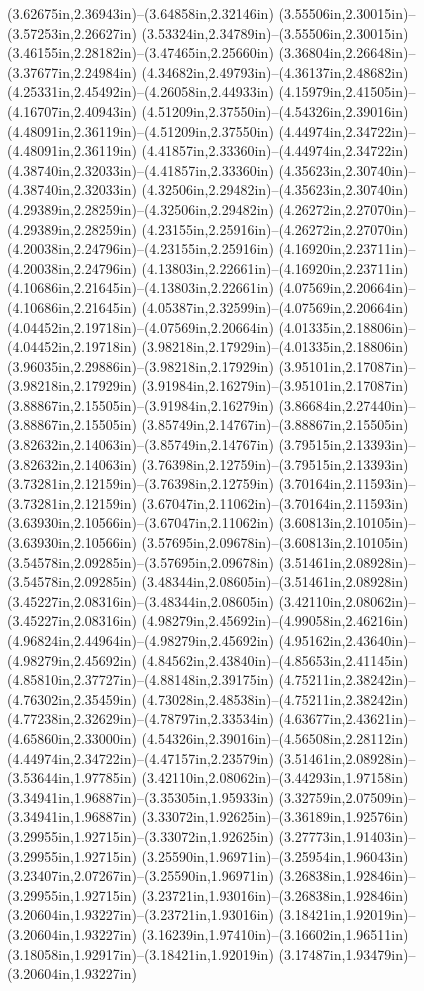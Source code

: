 (3.62675in,2.36943in)--(3.64858in,2.32146in) (3.55506in,2.30015in)--(3.57253in,2.26627in) (3.53324in,2.34789in)--(3.55506in,2.30015in) (3.46155in,2.28182in)--(3.47465in,2.25660in) (3.36804in,2.26648in)--(3.37677in,2.24984in) (4.34682in,2.49793in)--(4.36137in,2.48682in) (4.25331in,2.45492in)--(4.26058in,2.44933in) (4.15979in,2.41505in)--(4.16707in,2.40943in) (4.51209in,2.37550in)--(4.54326in,2.39016in) (4.48091in,2.36119in)--(4.51209in,2.37550in) (4.44974in,2.34722in)--(4.48091in,2.36119in) (4.41857in,2.33360in)--(4.44974in,2.34722in) (4.38740in,2.32033in)--(4.41857in,2.33360in) (4.35623in,2.30740in)--(4.38740in,2.32033in) (4.32506in,2.29482in)--(4.35623in,2.30740in) (4.29389in,2.28259in)--(4.32506in,2.29482in) (4.26272in,2.27070in)--(4.29389in,2.28259in) (4.23155in,2.25916in)--(4.26272in,2.27070in) (4.20038in,2.24796in)--(4.23155in,2.25916in) (4.16920in,2.23711in)--(4.20038in,2.24796in) (4.13803in,2.22661in)--(4.16920in,2.23711in) (4.10686in,2.21645in)--(4.13803in,2.22661in) (4.07569in,2.20664in)--(4.10686in,2.21645in) (4.05387in,2.32599in)--(4.07569in,2.20664in) (4.04452in,2.19718in)--(4.07569in,2.20664in) (4.01335in,2.18806in)--(4.04452in,2.19718in) (3.98218in,2.17929in)--(4.01335in,2.18806in) (3.96035in,2.29886in)--(3.98218in,2.17929in) (3.95101in,2.17087in)--(3.98218in,2.17929in) (3.91984in,2.16279in)--(3.95101in,2.17087in) (3.88867in,2.15505in)--(3.91984in,2.16279in) (3.86684in,2.27440in)--(3.88867in,2.15505in) (3.85749in,2.14767in)--(3.88867in,2.15505in) (3.82632in,2.14063in)--(3.85749in,2.14767in) (3.79515in,2.13393in)--(3.82632in,2.14063in) (3.76398in,2.12759in)--(3.79515in,2.13393in) (3.73281in,2.12159in)--(3.76398in,2.12759in) (3.70164in,2.11593in)--(3.73281in,2.12159in) (3.67047in,2.11062in)--(3.70164in,2.11593in) (3.63930in,2.10566in)--(3.67047in,2.11062in) (3.60813in,2.10105in)--(3.63930in,2.10566in) (3.57695in,2.09678in)--(3.60813in,2.10105in) (3.54578in,2.09285in)--(3.57695in,2.09678in) (3.51461in,2.08928in)--(3.54578in,2.09285in) (3.48344in,2.08605in)--(3.51461in,2.08928in) (3.45227in,2.08316in)--(3.48344in,2.08605in) (3.42110in,2.08062in)--(3.45227in,2.08316in) (4.98279in,2.45692in)--(4.99058in,2.46216in) (4.96824in,2.44964in)--(4.98279in,2.45692in) (4.95162in,2.43640in)--(4.98279in,2.45692in) (4.84562in,2.43840in)--(4.85653in,2.41145in) (4.85810in,2.37727in)--(4.88148in,2.39175in) (4.75211in,2.38242in)--(4.76302in,2.35459in) (4.73028in,2.48538in)--(4.75211in,2.38242in) (4.77238in,2.32629in)--(4.78797in,2.33534in) (4.63677in,2.43621in)--(4.65860in,2.33000in) (4.54326in,2.39016in)--(4.56508in,2.28112in) (4.44974in,2.34722in)--(4.47157in,2.23579in) (3.51461in,2.08928in)--(3.53644in,1.97785in) (3.42110in,2.08062in)--(3.44293in,1.97158in) (3.34941in,1.96887in)--(3.35305in,1.95933in) (3.32759in,2.07509in)--(3.34941in,1.96887in) (3.33072in,1.92625in)--(3.36189in,1.92576in) (3.29955in,1.92715in)--(3.33072in,1.92625in) (3.27773in,1.91403in)--(3.29955in,1.92715in) (3.25590in,1.96971in)--(3.25954in,1.96043in) (3.23407in,2.07267in)--(3.25590in,1.96971in) (3.26838in,1.92846in)--(3.29955in,1.92715in) (3.23721in,1.93016in)--(3.26838in,1.92846in) (3.20604in,1.93227in)--(3.23721in,1.93016in) (3.18421in,1.92019in)--(3.20604in,1.93227in) (3.16239in,1.97410in)--(3.16602in,1.96511in) (3.18058in,1.92917in)--(3.18421in,1.92019in) (3.17487in,1.93479in)--(3.20604in,1.93227in) 